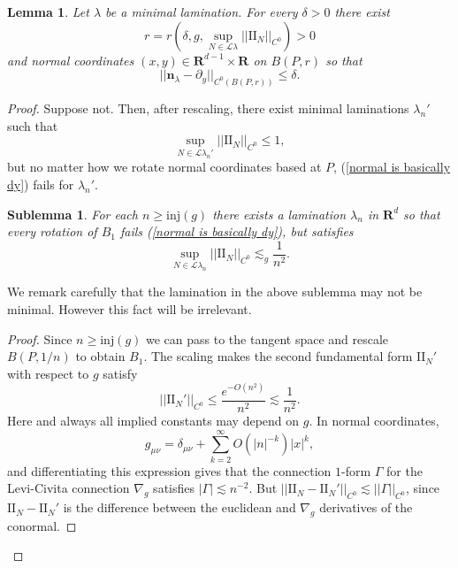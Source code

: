 \documentclass[reqno,11pt]{amsart}
\newcommand{\RR}{\mathbf{R}}
\newcommand{\Leaves}{\mathscr L}
\newcommand{\Two}{\mathrm{I\!I}}
\newcommand{\normal}{\mathbf n}
\newcommand{\inj}{\mathrm{inj}}
\newtheorem{lemma}[theorem]{Lemma}
\newtheorem{sublemma}[theorem]{Sublemma}
\theoremstyle{definition}
\numberwithin{equation}{section}
\begin{document}
\begin{lemma}\label{lams have C0 fields}
	Let $\lambda$ be a minimal lamination.
	For every $\delta > 0$ there exist
\begin{equation}\label{dependency of r}
	r = r\left(\delta, g, \sup_{N \in \Leaves \lambda} ||\Two_N||_{C^0}\right) > 0
\end{equation}
	and normal coordinates $(x, y) \in \RR^{d - 1} \times \RR$ on $B(P, r)$ so that
\begin{equation}\label{normal is basically dy}
	||\normal_\lambda - \partial_y||_{C^0(B(P, r))} \leq \delta.
\end{equation}
\end{lemma}
\begin{proof}
	Suppose not.
	Then, after rescaling, there exist minimal laminations $\lambda_n'$ such that
	$$\sup_{N \in \Leaves \lambda_n'} ||\Two_N||_{C^0} \leq 1,$$
	but no matter how we rotate normal coordinates based at $P$, (\ref{normal is basically dy}) fails for $\lambda_n'$.

\begin{sublemma}
	For each $n \geq \inj(g)$ there exists a lamination $\lambda_n$ in $\RR^d$ so that every rotation of $B_1$ fails (\ref{normal is basically dy}), but satisfies
\begin{equation}\label{bounds on Two in representation}
	\sup_{N \in \Leaves \lambda_n} ||\Two_N||_{C^0} \lesssim_g \frac{1}{n^2}.
\end{equation}
\end{sublemma}

We remark carefully that the lamination in the above sublemma may not be minimal.
However this fact will be irrelevant.

\begin{proof}
	Since $n \geq \inj(g)$ we can pass to the tangent space and rescale $B(P, 1/n)$ to obtain $B_1$. The scaling makes the second fundamental form $\Two_N'$ with respect to $g$ satisfy
$$||\Two_N'||_{C^0} \leq \frac{e^{-O(n^2)}}{n^2} \lesssim \frac{1}{n^2}.$$
	Here and always all implied constants may depend on $g$.
	In normal coordinates, 
	$$g_{\mu \nu} = \delta_{\mu \nu} + \sum_{k=2}^\infty O(|n|^{-k}) |x|^k,$$
	and differentiating this expression gives that the connection $1$-form $\Gamma$ for the Levi-Civita connection $\nabla_g$ satisfies $|\Gamma| \lesssim n^{-2}$.
	But $||\Two_N - \Two_N'||_{C^0} \lesssim ||\Gamma||_{C^0}$, since $\Two_N - \Two_N'$ is the difference between the euclidean and $\nabla_g$ derivatives of the conormal.
\end{proof}


\end{proof}
\end{document}
